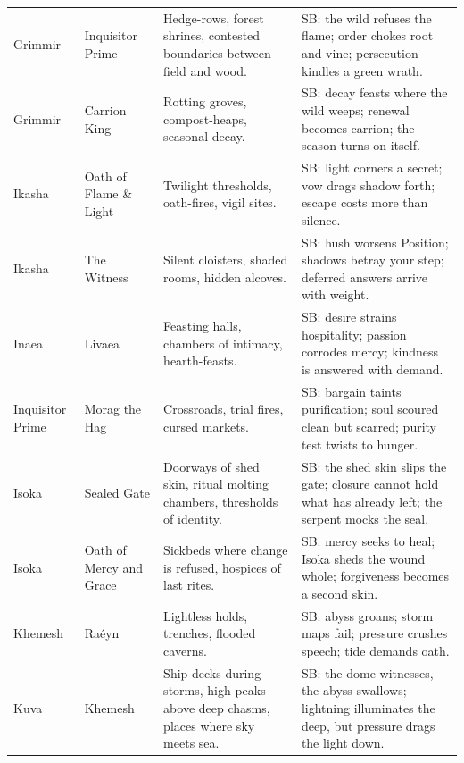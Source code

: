\begin{longtable}{@{}p{3.3cm}p{3.3cm}p{4.6cm}p{7.2cm}@{}}
  Grimmir & Inquisitor Prime &
  Hedge-rows, forest shrines, contested boundaries between field and wood. &
  SB: the wild refuses the flame; order chokes root and vine; persecution kindles a green wrath. \\

  Grimmir & Carrion King &
  Rotting groves, compost-heaps, seasonal decay. &
  SB: decay feasts where the wild weeps; renewal becomes carrion; the season turns on itself. \\

  Ikasha & Oath of Flame \& Light &
  Twilight thresholds, oath-fires, vigil sites. &
  SB: light corners a secret; vow drags shadow forth; escape costs more than silence. \\

  Ikasha & The Witness &
  Silent cloisters, shaded rooms, hidden alcoves. &
  SB: hush worsens Position; shadows betray your step; deferred answers arrive with weight. \\

  Inaea & Livaea &
  Feasting halls, chambers of intimacy, hearth-feasts. &
  SB: desire strains hospitality; passion corrodes mercy; kindness is answered with demand. \\

  Inquisitor Prime & Morag the Hag &
  Crossroads, trial fires, cursed markets. &
  SB: bargain taints purification; soul scoured clean but scarred; purity test twists to hunger. \\

  Isoka & Sealed Gate &
  Doorways of shed skin, ritual molting chambers, thresholds of identity. &
  SB: the shed skin slips the gate; closure cannot hold what has already left; the serpent mocks the seal. \\

  Isoka & Oath of Mercy and Grace &
  Sickbeds where change is refused, hospices of last rites. &
  SB: mercy seeks to heal; Isoka sheds the wound whole; forgiveness becomes a second skin. \\

  Khemesh & Raéyn &
  Lightless holds, trenches, flooded caverns. &
  SB: abyss groans; storm maps fail; pressure crushes speech; tide demands oath. \\
  
  Kuva & Khemesh &
  Ship decks during storms, high peaks above deep chasms, places where sky meets sea. &
  SB: the dome witnesses, the abyss swallows; lightning illuminates the deep, but pressure drags the light down. \\
  

\end{longtable}
